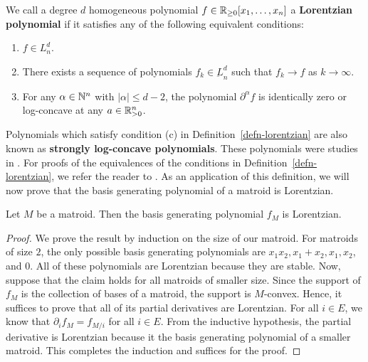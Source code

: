 \documentclass{puthesis-UG}
\begin{document}
\begin{defn} \label{defn-lorentzian}
	We call a degree $d$ homogeneous polynomial $f \in \mathbb{R}_{\geq 0}[x_1, \ldots, x_n]$ a \textbf{Lorentzian polynomial} if it satisfies any of the following equivalent conditions:
	\begin{enumerate}[label = (\alph*)]
		\item $f \in L_n^d$. 

		\item There exists a sequence of polynomials $f_k \in \underbar{L}_n^d$ such that $f_k \to f$ as $k \to \infty$.  

		\item For any $\alpha \in \mathbb{N}^n$ with $|\alpha| \leq d-2$, the polynomial $\partial^\alpha f$ is identically zero or log-concave at any $a \in \mathbb{R}_{>0}^n$. 
	\end{enumerate}
\end{defn}

Polynomials which satisfy condition (c) in Definition~\ref{defn-lorentzian} are also known as \textbf{strongly log-concave polynomials}. These polynomials were studies in \cite{anari2018logconcave}. For proofs of the equivalences of the conditions in Definition~\ref{defn-lorentzian}, we refer the reader to \cite{lorentzian-polynomials}. As an application of this definition, we will now prove that the basis generating polynomial of a matroid is Lorentzian.

\begin{thm} \label{basis-generating-polynomial-is-lorentzian-thm}
	Let $M$ be a matroid. Then the basis generating polynomial $f_M$ is Lorentzian. 
\end{thm}
\begin{proof}
	We prove the result by induction on the size of our matroid. For matroids of size $2$, the only possible basis generating polynomials are $x_1x_2, x_1 + x_2, x_1, x_2$, and $0$. All of these polynomials are Lorentzian because they are stable. Now, suppose that the claim holds for all matroids of smaller size. Since the support of $f_M$ is the collection of bases of a matroid, the support is $M$-convex. Hence, it suffices to prove that all of its partial derivatives are Lorentzian. For all $i \in E$, we know that $\partial_i f_M = f_{M / i}$ for all $i \in E$. From the inductive hypothesis, the partial derivative is Lorentzian because it the basis generating polynomial of a smaller matroid. This completes the induction and suffices for the proof.  
\end{proof}
\end{document}
